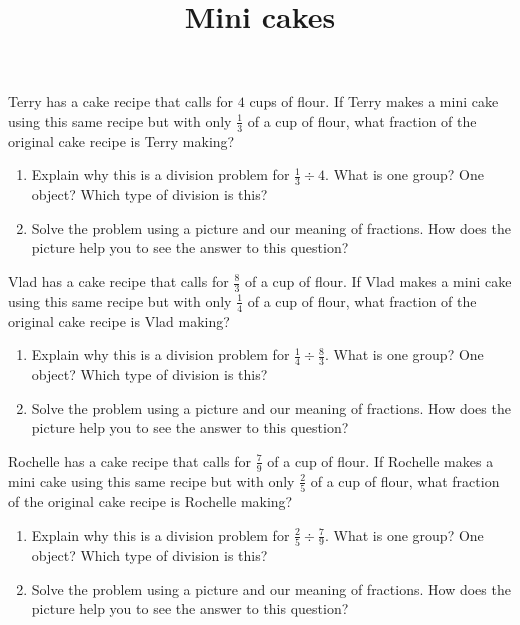 \documentclass[nooutcomes,noauthor]{ximera}
\title{Mini cakes}
\begin{document}
\begin{abstract}
\end{abstract}

\maketitle


\begin{problem}
Terry has a cake recipe that calls for $4$ cups of flour. If Terry makes a mini cake using this same recipe but with only $\frac{1}{3}$ of a cup of flour, what fraction of the original cake recipe is Terry making?

\begin{enumerate}
	\item Explain why this is a division problem for $\frac{1}{3} \div 4$. What is one group? One object? Which type of division is this?
	\item Solve the problem using a picture and our meaning of fractions. How does the picture help you to see the answer to this question?
\end{enumerate}
\end{problem}



\begin{problem}
Vlad has a cake recipe that calls for $\frac{8}{3}$ of a cup of flour. If Vlad makes a mini cake using this same recipe but with only $\frac{1}{4}$ of a cup of flour, what fraction of the original cake recipe is Vlad making?
\begin{enumerate}
	\item Explain why this is a division problem for $\frac{1}{4} \div \frac{8}{3}$. What is one group? One object? Which type of division is this?
	\item Solve the problem using a picture and our meaning of fractions. How does the picture help you to see the answer to this question?
\end{enumerate}
\end{problem}


\begin{problem}
Rochelle has a cake recipe that calls for $\frac{7}{9}$ of a cup of flour. If Rochelle makes a mini cake using this same recipe but with only $\frac{2}{5}$ of a cup of flour, what fraction of the original cake recipe is Rochelle making?
\begin{enumerate}
	\item Explain why this is a division problem for $\frac{2}{5} \div \frac{7}{9}$. What is one group? One object? Which type of division is this?
	\item Solve the problem using a picture and our meaning of fractions. How does the picture help you to see the answer to this question?
\end{enumerate}
\end{problem}
\end{document}

